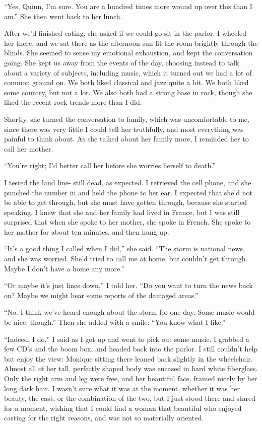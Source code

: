 ``Yes, Quinn, I'm sure. You are a hundred times more wound up over this than I am.'' She
then went back to her lunch.

After we'd finished eating, she asked if we could go sit in the parlor. I wheeled her
there, and we sat there as the afternoon sun lit the room brightly through the blinds. She
seemed to sense my emotional exhaustion, and kept the conversation going. She kept us away from
the events of the day, choosing instead to talk about a variety of subjects, including music,
which it turned out we had a lot of common ground on. We both liked classical and jazz quite a
bit. We both liked some country, but not a lot. We also both had a strong base in rock, though
she liked the recent rock trends more than I did.

Shortly, she turned the conversation to family, which was uncomfortable to me, since there
was very little I could tell her truthfully, and most everything was painful to think about. As
she talked about her family more, I reminded her to call her mother.

``You're right; I'd better call her before she worries herself to death.''

I tested the land line- still dead, as expected. I retrieved the cell phone, and she
punched the number in and held the phone to her ear. I expected that she'd not be able to get
through, but she must have gotten through, because she started speaking. I knew that she and her
family had lived in France, but I was still surprised that when she spoke to her mother, she
spoke in French. She spoke to her mother for about ten minutes, and then hung up.

``It's a good thing I called when I did,'' she said. ``The storm is national news, and she
was worried. She'd tried to call me at home, but couldn't get through. Maybe I don't have a home
any more.''

``Or maybe it's just lines down,'' I told her. ``Do you want to turn the news back on?
Maybe we might hear some reports of the damaged areas.''

``No. I think we've heard enough about the storm for one day. Some music would be nice,
though.'' Then she added with a smile: ``You know what I like.''

``Indeed, I do,'' I said as I got up and went to pick out some music. I grabbed a few CD's
and the boom box, and headed back into the parlor. I still couldn't help but enjoy the view:
Monique sitting there leaned back slightly in the wheelchair. Almost all of her tall, perfectly
shaped body was encased in hard white fiberglass. Only the right arm and leg were free, and her
beautiful face, framed nicely by her long dark hair. I wasn't sure what it was at the moment,
whether it was her beauty, the cast, or the combination of the two, but I just stood there and
stared for a moment, wishing that I could find a woman that beautiful who enjoyed casting for
the right reasons, and was not so materially oriented.

